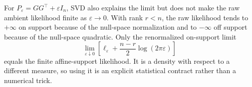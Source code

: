 For \(P_\varepsilon=GG^\top+\varepsilon I_n\), SVD also explains the limit but
does not make the raw ambient likelihood finite as \(\varepsilon\to0\).  With
rank \(r<n\), the raw likelihood tends to \(+\infty\) on support because of the
null-space normalization and to \(-\infty\) off support because of the
null-space quadratic.  Only the renormalized on-support limit
\[
 \lim_{\varepsilon\downarrow0}
 \left[\ell_\varepsilon+\frac{n-r}{2}\log(2\pi\varepsilon)\right]
\]
equals the finite affine-support likelihood.  It is a density with respect to
a different measure, so using it is an explicit statistical contract rather
than a numerical trick.
